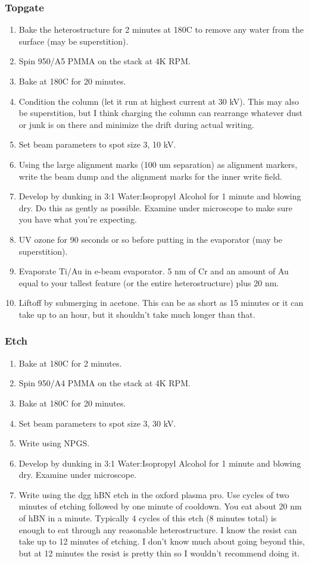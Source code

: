 \begin{appendices}
\subsubsection{Topgate}
\begin{enumerate}
	\item Bake the heterostructure for 2 minutes at 180C to remove any water from the surface (may be superstition).
	\item Spin 950/A5 PMMA on the stack at 4K RPM.
	\item Bake at 180C for 20 minutes.
	\item Condition the column (let it run at highest current at 30 kV). This may also be superstition, but I think charging the column can rearrange whatever dust or junk is on there and minimize the drift during actual writing.
	\item Set beam parameters to spot size 3, 10 kV.
	\item Using the large alignment marks (100 um separation) as alignment markers, write the beam dump and the alignment marks for the inner write field.
	\item Develop by dunking in 3:1 Water:Isopropyl Alcohol for 1 minute and blowing dry. Do this as gently as possible. Examine under microscope to make sure you have what you’re expecting.
	\item UV ozone for 90 seconds or so before putting in the evaporator (may be superstition).
	\item Evaporate Ti/Au in e-beam evaporator. 5 nm of Cr and an amount of Au equal to your tallest feature (or the entire heterostructure) plus 20 nm.
	\item Liftoff by submerging in acetone. This can be as short as 15 minutes or it can take up to an hour, but it shouldn’t take much longer than that.
\end{enumerate}

\subsubsection{Etch}
\begin{enumerate}
	\item Bake at 180C for 2 minutes.
	\item Spin 950/A4 PMMA on the stack at 4K RPM.
	\item Bake at 180C for 20 minutes.
	\item Set beam parameters to spot size 3, 30 kV.
	\item Write using NPGS.
	\item Develop by dunking in 3:1 Water:Isopropyl Alcohol for 1 minute and blowing dry. Examine under microscope.
	\item Write using the dgg hBN etch in the oxford plasma pro. Use cycles of two minutes of etching followed by one minute of cooldown. You eat about 20 nm of hBN in a minute. Typically 4 cycles of this etch (8 minutes total) is enough to eat through any reasonable heterostructure. I know the resist can take up to 12 minutes of etching. I don’t know much about going beyond this, but at 12 minutes the resist is pretty thin so I wouldn’t recommend doing it.
\end{enumerate}


\end{appendices}
